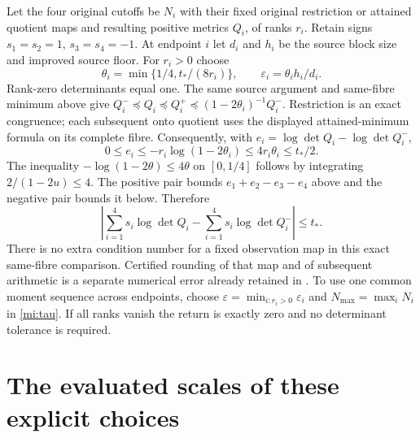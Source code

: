 \documentclass[11pt]{article}
\begin{document}
Let the four original cutoffs be $N_i$ with their fixed original
restriction or attained quotient maps and resulting positive
metrics $Q_i$, of ranks $r_i$. Retain signs
$s_1=s_2=1$, $s_3=s_4=-1$.
At endpoint $i$ let $d_i$ and $h_i$ be the source block size and
improved source floor. For $r_i>0$ choose
\begin{equation}\tag{MI22}\label{mi:detbudget}
 \theta_i=\min\{1/4,t_*/(8r_i)\},\qquad
 \varepsilon_i=\theta_i h_i/d_i.
\end{equation}
Rank-zero determinants equal one. The same source argument and
same-fibre minimum above give
$Q_i^-\preceq Q_i\preceq Q_i^+
\preceq(1-2\theta_i)^{-1}Q_i^-$.
Restriction is an exact congruence; each subsequent onto quotient
uses the displayed attained-minimum formula on its complete fibre.
Consequently, with $e_i=\log\det Q_i-\log\det Q_i^-$,
\[
 0\le e_i\le-r_i\log(1-2\theta_i)
 \le4r_i\theta_i\le t_*/2.
\]
The inequality $-\log(1-2\theta)\le4\theta$ on $[0,1/4]$
follows by integrating $2/(1-2u)\le4$.
The positive pair bounds $e_1+e_2-e_3-e_4$ above and the negative
pair bounds it below. Therefore
\begin{equation}\tag{MI23}\label{mi:four}
 \left|\sum_{i=1}^4s_i\log\det Q_i
       -\sum_{i=1}^4s_i\log\det Q_i^-\right|\le t_*.
\end{equation}
There is no extra condition number for a fixed observation map
in this exact same-fibre comparison. Certified rounding of that map
and of subsequent arithmetic is a separate numerical error already
retained in \cite{oldNP}. To use one common moment sequence across
endpoints, choose $\varepsilon=\min_{i:r_i>0}\varepsilon_i$ and
$N_{\max}=\max_iN_i$ in \eqref{mi:tau}. If all ranks vanish the
return is exactly zero and no determinant tolerance is required.

\section{The evaluated scales of these explicit choices}
\end{document}
